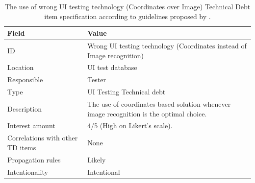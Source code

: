     \begin{table}[!htbp]
		\centering
		\tabulinesep=1.2mm
		\begin{tabu} to \textwidth {|X|X[3]|}

			\hline
			\textbf{Field} & \textbf{Value} \\
			\hline

			ID & Wrong UI testing technology (Coordinates instead of Image recognition)\\
			\hline

			Location & UI test database \\
			\hline

			Responsible & Tester \\
			\hline

			Type & UI Testing Technical debt \\
			\hline

			Description & The use of coordinates based solution whenever image recognition is the optimal choice.\\
			\hline



			Interest amount &  4/5 (High on Likert's scale). \\
			\hline



			Correlations with other TD items & None\\
			\hline



			Propagation rules & Likely\\
			\hline

			Intentionality & Intentional \\
			\hline

		\end{tabu}
		\caption[Use of wrong UI testing technology - Coordinates over Image - TD item specification]{The use of wrong UI testing technology (Coordinates over Image) Technical Debt item specification according to guidelines proposed by \cite{mapping_study_td}.}
		\label{tab:res-coordinates-vs-image}
	\end{table}


